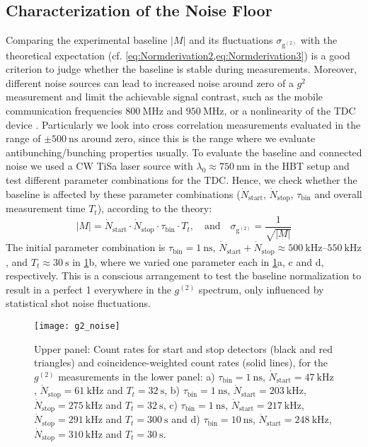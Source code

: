 \subsection{Characterization of the Noise Floor}
Comparing the experimental baseline $|M|$ and its fluctuations $\sigma_\mathrm{g^{(2)}}$ with the theoretical expectation (cf. \cref{eq:Normderivation2,eq:Normderivation3}) is a good criterion to judge whether the baseline is stable during measurements. Moreover, different noise sources can lead to increased noise around zero of a $g^{2}$ measurement and limit the achievable signal contrast, such as the mobile communication frequencies $\SI{800}{\MHz}$ and $\SI{950}{\MHz}$, or a nonlinearity of the \ac{TDC} device \cite{zmija_design_2018}. Particularly we look into cross correlation measurements evaluated in the range of $\pm\SI{500}{\ns}$ around zero, since this is the range where we evaluate antibunching/bunching properties usually. To evaluate the baseline and connected noise we used a \ac{CW} \ac{TiSa} laser source with $\lambda_0\approx \SI{750}{\nm}$ in the \ac{HBT} setup and test different parameter combinations for the \ac{TDC}. Hence, we check whether the baseline is affected by these parameter combinations ($\dot{N}_\mathrm{start}$, $\dot{N}_\mathrm{stop}$, $\tau_\mathrm{bin}$ and overall measurement time $T_t$), according to the theory: 
\begin{equation}\label{eq:g2_noise_floor_M}
	|M|=\dot{N}_\mathrm{start}\cdot \dot{N}_\mathrm{stop}\cdot\tau_\mathrm{bin}\cdot T_t,\quad\mathrm{and}\quad \sigma_\mathrm{g^{(2)}}=\dfrac{1}{\sqrt{|M|}}
\end{equation}
The initial parameter combination is $\tau_\mathrm{bin}=\SI{1}{\ns}$, $\dot{N}_\mathrm{start}+\dot{N}_\mathrm{stop}\approx \SIrange{500}{550}{\kHz}$, and $T_t\approx\SI{30}{\s}$ in \cref{fig:g2_noise}b, where we varied one parameter each in \cref{fig:g2_noise}a, c and d, respectively. This is a conscious arrangement to test the baseline normalization to result in a perfect 1 everywhere in the $g^{(2)}$ spectrum, only influenced by statistical shot noise fluctuations. 
\begin{figure}[ht]
	\centering
	\texttt{[image: g2\_noise]}
	\caption{Upper panel: Count rates for start and stop detectors (black and red triangles) and coincidence-weighted count rates (solid lines), for the $g^{(2)}$ measurements in the lower panel: a) $\tau_\mathrm{bin}=\SI{1}{\ns}$, $\dot{N}_\mathrm{start}=\SI{47}{\kHz}$, $\dot{N}_\mathrm{stop}=\SI{61}{\kHz}$ and $T_t=\SI{32}{\s}$, b) $\tau_\mathrm{bin}=\SI{1}{\ns}$, $\dot{N}_\mathrm{start}=\SI{203}{\kHz}$, $\dot{N}_\mathrm{stop}=\SI{275}{\kHz}$ and $T_t=\SI{32}{\s}$, c) $\tau_\mathrm{bin}=\SI{1}{\ns}$, $\dot{N}_\mathrm{start}=\SI{217}{\kHz}$, $\dot{N}_\mathrm{stop}=\SI{291}{\kHz}$ and $T_t=\SI{300}{\s}$ and d) $\tau_\mathrm{bin}=\SI{10}{\ns}$, $\dot{N}_\mathrm{start}=\SI{248}{\kHz}$, $\dot{N}_\mathrm{stop}=\SI{310}{\kHz}$ and $T_t=\SI{30}{\s}$.}
	\label{fig:g2_noise}
\end{figure}
